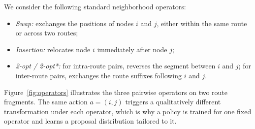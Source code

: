 \documentclass[letterpaper]{article} %
\begin{document}
We consider the following standard neighborhood operators:
\begin{itemize}
\item \textit{Swap:} exchanges the positions of nodes $i$ and $j$, either within the same route or across two routes;
\item \textit{Insertion:} relocates node $i$ immediately after node $j$;
\item \textit{2-opt / 2-opt*:} for intra-route pairs, reverses the segment between $i$ and $j$; for inter-route pairs, exchanges the route suffixes following $i$ and $j$.
\end{itemize}

Figure~\ref{fig:operators} illustrates the three pairwise operators on two route fragments. The same action $a = (i,j)$ triggers a qualitatively different transformation under each operator, which is why a policy is trained for one fixed operator and learns a proposal distribution tailored to it.
\end{document}
